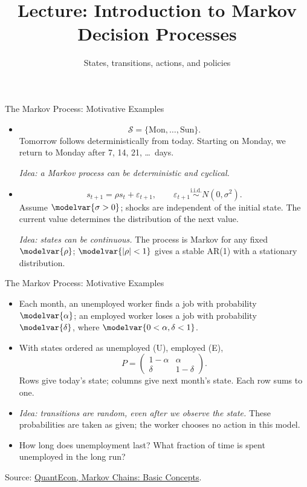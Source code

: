 \newcommand{\CourseTemplatePath}{../../../../../templates/slides/}

\title[Markov Decision Processes]{Lecture: Introduction to Markov Decision Processes}
\subtitle{States, transitions, actions, and policies}

\makecoursetitle


\begin{frame}{The Markov Process: Motivative Examples}
\begin{itemize}
  \item {}
    \[\mathcal S=\{\text{Mon},\ldots,\text{Sun}\}.\]
    Tomorrow follows deterministically from today. Starting on Monday, we return to Monday after 7, 14, 21, \ldots\ days.
    \par\textit{Idea: a Markov process can be deterministic and cyclical.}
  \item {}
    \[s_{t+1}=\rho s_t+\varepsilon_{t+1},\qquad \varepsilon_{t+1}\overset{\mathrm{i.i.d.}}\sim N(0,\sigma^2).\]
    Assume \(\modelvar{\sigma>0}\); shocks are independent of the initial state. The current value determines the distribution of the next value.
    \par\textit{Idea: states can be continuous.} The process is Markov for any fixed \(\modelvar{\rho}\); \(\modelvar{|\rho|<1}\) gives a stable AR(1) with a stationary distribution.
\end{itemize}
\end{frame}

\begin{frame}{The Markov Process: Motivative Examples}
\begin{itemize}
  \item Each month, an unemployed worker finds a job with probability \(\modelvar{\alpha}\); an employed worker loses a job with probability \(\modelvar{\delta}\), where \(\modelvar{0<\alpha,\delta<1}\).
  \item With states ordered as unemployed (U), employed (E),
    \[P=\begin{pmatrix}1-\alpha&\alpha\\\delta&1-\delta\end{pmatrix}.\]
    Rows give today's state; columns give next month's state. Each row sums to one.
  \item \textit{Idea: transitions are random, even after we observe the state.}
    These probabilities are taken as given; the worker chooses no action in this model.
  \item How long does unemployment last? What fraction of time is spent unemployed in the long run?
\end{itemize}
{\footnotesize Source: \href{https://intro.quantecon.org/markov_chains_I.html}{QuantEcon, Markov Chains: Basic Concepts}.}
\end{frame}


